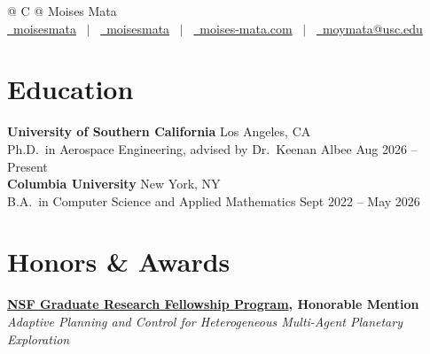 \documentclass[a4paper,12pt]{article}
\begin{document}
\pagestyle{empty} 



\begin{tabularx}{\linewidth}{@{} C @{}}
\Huge{Moises Mata} \\[7.5pt]
\href{https://github.com/moisesmata}{\raisebox{-0.05\height}\faGithub\ moisesmata} \ $|$ \ 
\href{https://linkedin.com/in/moises-mata-t}{\raisebox{-0.05\height}\faLinkedin\ moisesmata} \ $|$ \ 
\href{https://moises-mata.com}{\raisebox{-0.05\height}\faGlobe \ moises-mata.com} \ $|$ \ 
\href{mailto:moymata@usc.edu}{\raisebox{-0.05\height}\faEnvelope \ moymata@usc.edu} \\[3.75pt]
\end{tabularx}

\section{Education}
\noindent\textbf{University of Southern California} \dotfill Los Angeles, CA \\
Ph.D.\ in Aerospace Engineering, advised by Dr.\ Keenan Albee \dotfill Aug 2026 -- Present \\[3.75pt]
\noindent\textbf{Columbia University} \dotfill New York, NY \\
B.A.\ in Computer Science and Applied Mathematics \dotfill Sept 2022 -- May 2026

\section{Honors \& Awards}
\noindent\textbf{\href{https://urf.columbia.edu/news/forty-eight-columbia-undergraduate-affiliates-awarded-national-science-foundation-graduate}{NSF Graduate Research Fellowship Program}, Honorable Mention}  \\
\textit{Adaptive Planning and Control for Heterogeneous Multi-Agent Planetary Exploration}
\end{document}
